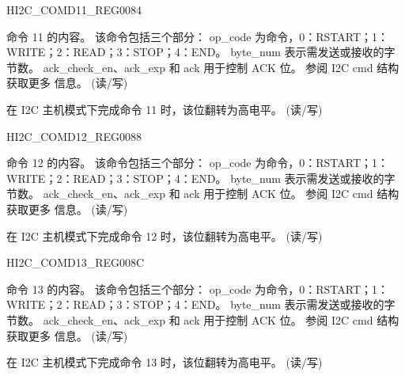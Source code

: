 \begin{register}{H}{I2C\_COMD11\_REG}{\hexprefix{}0084}\label{regdesc:I2CCOMD11REG}
%
%
%
\regnewline%
\begin{regdesc}\begin{reglist}
\label{fielddesc:I2CCOMMAND11}\item [I2C\_COMMAND11] 命令 11 的内容。 该命令包括三个部分：
op\_code 为命令，0：RSTART；1：WRITE；2：READ；3：STOP；4：END。
byte\_num 表示需发送或接收的字节数。
ack\_check\_en、ack\_exp 和 ack 用于控制 ACK 位。 参阅 I2C cmd 结构获取更多
信息。 (读/写)
\label{fielddesc:I2CCOMMAND11DONE}\item [I2C\_COMMAND11\_DONE] 在 I2C 主机模式下完成命令 11 时，该位翻转为高电平。 (读/写)
\end{reglist}\end{regdesc}
\end{register}


\begin{register}{H}{I2C\_COMD12\_REG}{\hexprefix{}0088}\label{regdesc:I2CCOMD12REG}
%
%
%
\regnewline%
\begin{regdesc}\begin{reglist}
\label{fielddesc:I2CCOMMAND12}\item [I2C\_COMMAND12] 命令 12 的内容。 该命令包括三个部分：
op\_code 为命令，0：RSTART；1：WRITE；2：READ；3：STOP；4：END。
byte\_num 表示需发送或接收的字节数。
ack\_check\_en、ack\_exp 和 ack 用于控制 ACK 位。 参阅 I2C cmd 结构获取更多
信息。 (读/写)
\label{fielddesc:I2CCOMMAND12DONE}\item [I2C\_COMMAND12\_DONE] 在 I2C 主机模式下完成命令 12 时，该位翻转为高电平。 (读/写)
\end{reglist}\end{regdesc}
\end{register}


\begin{register}{H}{I2C\_COMD13\_REG}{\hexprefix{}008C}\label{regdesc:I2CCOMD13REG}
%
%
%
\regnewline%
\begin{regdesc}\begin{reglist}
\label{fielddesc:I2CCOMMAND13}\item [I2C\_COMMAND13] 命令 13 的内容。 该命令包括三个部分：
op\_code 为命令，0：RSTART；1：WRITE；2：READ；3：STOP；4：END。
byte\_num 表示需发送或接收的字节数。
ack\_check\_en、ack\_exp 和 ack 用于控制 ACK 位。 参阅 I2C cmd 结构获取更多
信息。 (读/写)
\label{fielddesc:I2CCOMMAND13DONE}\item [I2C\_COMMAND13\_DONE] 在 I2C 主机模式下完成命令 13 时，该位翻转为高电平。 (读/写)
\end{reglist}\end{regdesc}
\end{register}


